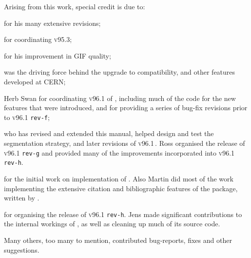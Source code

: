 \bigskip\noindent
Arising from this work, special credit is due to:
\begin{htmllist}
\item [\Hennecke] 
for his many extensive revisions;

\item [\Noworolski] 
for coordinating \textsc{v95.3};

\item [\Isani] 
for his improvement in GIF quality;

%
\item [\Goossens] 
was the driving force behind the upgrade to \LaTeXe{} compatibility,
and other features developed at CERN;

\item [Herb Swan] 
for coordinating \textsc{v96.1} of \latextohtml,
including much of the \Perl{} code
for the new features that were introduced,
and for providing a series of bug-fix revisions
prior to  \textsc{v96.1} \texttt{rev-f};

\item [\RossMoore] 
who has revised and extended this manual, helped design and test the
segmentation strategy, and later revisions of \textsc{v96.1}\,.
Ross organised the release of \textsc{v96.1} \texttt{rev-g}
and provided many of the improvements
incorporated into \textsc{v96.1} \texttt{rev-h}.

\item [\Wilck] 
for the initial work on implementation of .
Also Martin did most of the work implementing the extensive citation and
bibliographic features of the  package, written by \PatrickDaly.

\item [\Lippman] 
for organising the release of \textsc{v96.1} \texttt{rev-h}.
Jens made significant contributions to
the internal workings of \latextohtml,
as well as cleaning up much of its source code.
\end{htmllist}

\htmlrule


\bigskip\noindent
Many others, too many to mention, contributed bug-reports,
fixes and other suggestions.

